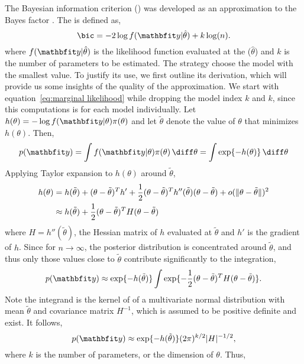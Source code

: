The Bayesian information criterion (\bic) was developed as an approximation to
the Bayes factor \cite{Schwarz:1978uv}. The \bic is defined as,
\begin{equation}
  \text{\bic} = -2\log f(\data|\hat\theta) + k\log(n).
\end{equation}
where $f(\data|\hat\theta)$ is the likelihood function evaluated at the \mle
($\hat\theta$) and $k$ is the number of parameters to be estimated. The \bic
strategy choose the model with the smallest \bic value. To justify its use, we
first outline its derivation, which will provide us some insights of the
quality of the approximation. We start with equation~\eqref{eq:marginal
  likelihood} while dropping the model index $k$ and $k$, since this
computations is for each model individually. Let $h(\theta) = - \log
f(\data|\theta)\pi(\theta)$ and let $\tilde\theta$ denote the value of $\theta$ that minimizes
$h(\theta)$. Then,
\begin{equation}
  p(\data) = \int f(\data|\theta)\pi(\theta)\intd\theta = \int\exp\{-h(\theta)\}\intd\theta
\end{equation}
Applying Taylor expansion to $h(\theta)$ around $\tilde\theta$,
\begin{align}
  h(\theta)
  &= h(\tilde\theta) + (\theta - \tilde\theta)^T h'
  + \frac{1}{2}(\theta - \tilde\theta)^T h''(\tilde\theta) (\theta - \tilde\theta)
  + o(\lVert \theta - \tilde\theta \rVert)^2 \notag\\
  &\approx h(\tilde\theta) + \frac{1}{2}(\theta - \tilde\theta)^T H (\theta - \tilde\theta)
\end{align}
where $H = h''(\tilde\theta)$, the Hessian matrix of $h$ evaluated at $\tilde\theta$ and
$h'$ is the gradient of $h$. Since for $n\to\infty$, the posterior
distribution is concentrated around $\tilde\theta$, and thus only those values close
to $\tilde\theta$ contribute significantly to the integration,
\begin{equation}
  p(\data)\approx\exp\{-h(\tilde\theta)\}
  \int\exp\{-\frac{1}{2}(\theta - \tilde\theta)^TH(\theta - \tilde\theta)\}.
\end{equation}
Note the integrand is the kernel of of a multivariate normal distribution with
mean $\tilde\theta$ and covariance matrix $H^{-1}$, which is assumed to be positive
definite and exist. It follows,
\begin{equation}
  p(\data) \approx \exp\{-h(\tilde\theta)\} (2\pi)^{k/2} \lvert H \rvert^{-1/2},
\end{equation}
where $k$ is the number of parameters, or the dimension of $\theta$. Thus,
